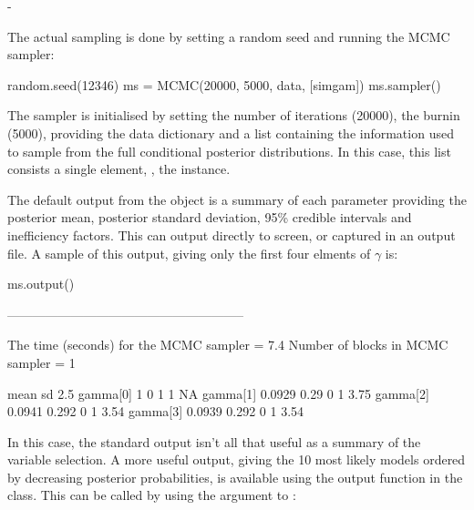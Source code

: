 -\documentclass[article]{jss}
\begin{document}
The actual sampling is done by setting a random seed and running the
MCMC sampler:
\begin{Code}
random.seed(12346)
ms = MCMC(20000, 5000, data, [simgam])
ms.sampler()
\end{Code}

The  sampler is initialised by setting the number of
iterations (20000), the burnin (5000), providing the data dictionary
 and a list containing the information used to sample from
the full conditional posterior distributions. In this case, this list
consists a single element, , the 
instance.

The default output from the  object is a summary of each
parameter providing the posterior mean, posterior standard deviation,
95\% credible intervals and inefficiency factors. This can output
directly to screen, or captured in an output file. A sample of this
output, giving only the first four elments of $\gamma$ is:

\begin{CodeChunk}
\begin{CodeInput}
ms.output()
\end{CodeInput}
\begin{CodeOutput}
--------------------------------------------------------

The time (seconds) for the MCMC sampler =  7.4
Number of blocks in MCMC sampler =  1

                    mean          sd         2.5%
    gamma[0]           1           0            1           1         NA
    gamma[1]      0.0929        0.29            0           1         3.75
    gamma[2]      0.0941       0.292            0           1         3.54
    gamma[3]      0.0939       0.292            0           1         3.54
\end{CodeOutput}
\end{CodeChunk}

In this case, the standard output isn't all that useful as a summary
of the variable selection. A more useful output, giving the 10 most
likely models ordered by decreasing posterior probabilities, is
available using the output function in the 
class. This can be called by using the  argument to
:
\end{document}
